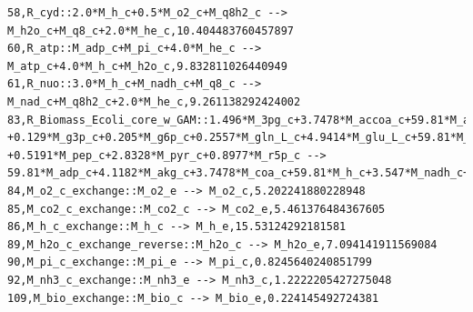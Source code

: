 \documentclass{article}
\begin{document}
\begin{landscape}
\begin{verbatim}
58,R_cyd::2.0*M_h_c+0.5*M_o2_c+M_q8h2_c --> M_h2o_c+M_q8_c+2.0*M_he_c,10.404483760457897
60,R_atp::M_adp_c+M_pi_c+4.0*M_he_c --> M_atp_c+4.0*M_h_c+M_h2o_c,9.832811026440949
61,R_nuo::3.0*M_h_c+M_nadh_c+M_q8_c --> M_nad_c+M_q8h2_c+2.0*M_he_c,9.261138292424002
83,R_Biomass_Ecoli_core_w_GAM::1.496*M_3pg_c+3.7478*M_accoa_c+59.81*M_atp_c+0.361*M_e4p_c+0.0709*M_f6p_c
+0.129*M_g3p_c+0.205*M_g6p_c+0.2557*M_gln_L_c+4.9414*M_glu_L_c+59.81*M_h2o_c+3.547*M_nad_c+13.0279*M_nadph_c+1.7867*M_oaa_c
+0.5191*M_pep_c+2.8328*M_pyr_c+0.8977*M_r5p_c --> 
59.81*M_adp_c+4.1182*M_akg_c+3.7478*M_coa_c+59.81*M_h_c+3.547*M_nadh_c+13.0279*M_nadp_c+59.81*M_pi_c+M_bio_c,0.224145492724381
84,M_o2_c_exchange::M_o2_e --> M_o2_c,5.202241880228948
85,M_co2_c_exchange::M_co2_c --> M_co2_e,5.461376484367605
86,M_h_c_exchange::M_h_c --> M_h_e,15.53124292181581
89,M_h2o_c_exchange_reverse::M_h2o_c --> M_h2o_e,7.094141911569084
90,M_pi_c_exchange::M_pi_e --> M_pi_c,0.8245640240851799
92,M_nh3_c_exchange::M_nh3_e --> M_nh3_c,1.2222205427275048
109,M_bio_exchange::M_bio_c --> M_bio_e,0.224145492724381
\end{verbatim}


\end{landscape}
\end{document}
